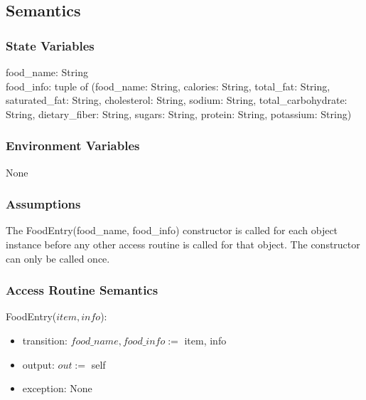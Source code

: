 \documentclass[12pt, titlepage]{article}
\begin{document}
\subsection{Semantics}

\subsubsection{State Variables}
food\_name: String\\
food\_info: tuple of (food\_name: String, calories: String, total\_fat: String, saturated\_fat: String, cholesterol: String, sodium: String, total\_carbohydrate: String, dietary\_fiber: String, sugars: String, protein: String, potassium: String)


\subsubsection{Environment Variables}

None


\subsubsection{Assumptions}

The FoodEntry(food\_name, food\_info) constructor is called for each object instance before any other access
routine is called for that object. The constructor can only be called once.


\subsubsection{Access Routine Semantics}

\noindent FoodEntry($item, info$):
\begin{itemize}
	\item transition: $food\_name, food\_info :=$ item, info
	\item output: $out :=$ self
	\item exception: None
\end{itemize}
\end{document}
